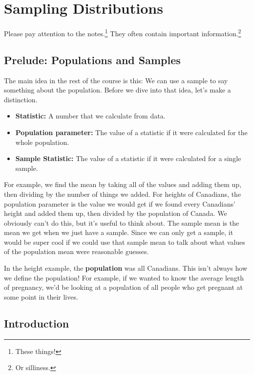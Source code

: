 \documentclass[
  letterpaper,
  DIV=11,
  numbers=noendperiod]{scrreprt}
\providecommand{\tightlist}{%
  \setlength{\itemsep}{0pt}\setlength{\parskip}{0pt}}\usepackage{longtable,booktabs,array}
\begin{document}
\hypertarget{sampling-distributions}{%
\chapter{Sampling Distributions}\label{sampling-distributions}}

Please pay attention to the notes.\footnote{These things!} They often
contain important information.\footnote{Or silliness.}

\hypertarget{prelude-populations-and-samples}{%
\section{Prelude: Populations and
Samples}\label{prelude-populations-and-samples}}

The main idea in the rest of the course is this: We can use a sample to
say something about the population. Before we dive into that idea, let's
make a distinction.

\begin{itemize}
\tightlist
\item
  \textbf{Statistic:} A number that we calculate from data.
\item
  \textbf{Population parameter:} The value of a statistic if it were
  calculated for the whole population.
\item
  \textbf{Sample Statistic:} The value of a statistic if it were
  calculated for a single sample.
\end{itemize}

For example, we find the mean by taking all of the values and adding
them up, then dividing by the number of things we added. For heights of
Canadians, the population parameter is the value we would get if we
found every Canadians' height and added them up, then divided by the
population of Canada. We obviously can't do this, but it's useful to
think about. The sample mean is the mean we get when we just have a
sample. Since we can only get a sample, it would be super cool if we
could use that sample mean to talk about what values of the population
mean were reasonable guesses.

In the height example, the \textbf{population} was all Canadians. This
isn't always how we define the population! For example, if we wanted to
know the average length of pregnancy, we'd be looking at a population of
all people who get pregnant at some point in their lives.

\hypertarget{introduction-5}{%
\section{Introduction}\label{introduction-5}}
\end{document}
